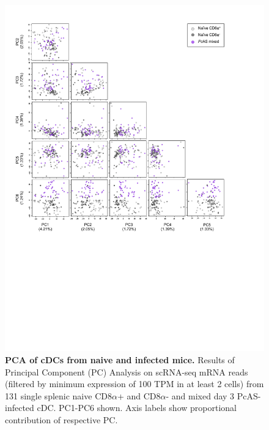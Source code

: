 \begin{figure}
    \centering
    \includegraphics[width=\textwidth]{"Fig S21 rev3"}
    \caption[PCA of cDCs from naive and infected mice]{\textbf{PCA of cDCs from naive and infected mice.} Results of Principal Component (PC) Analysis on scRNA-seq mRNA reads (filtered by minimum expression of 100 TPM in at least 2 cells) from 131 single splenic naive CD8\( \alpha \)+ and CD8\( \alpha \)- and mixed day 3 PcAS-infected cDC. PC1-PC6 shown. Axis labels show proportional contribution of respective PC.}
    \label{fig:ms21}
\end{figure}

